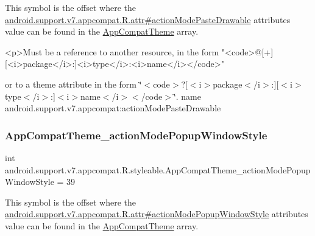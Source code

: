 This symbol is the offset where the \hyperlink{classandroid_1_1support_1_1v7_1_1appcompat_1_1R_1_1attr_a15a0bea2cfb65d234b8d8c3eb6befecf}{android.\+support.\+v7.\+appcompat.\+R.\+attr\#action\+Mode\+Paste\+Drawable} attribute\textquotesingle{}s value can be found in the \hyperlink{classandroid_1_1support_1_1v7_1_1appcompat_1_1R_1_1styleable_a5c42f89e8a410c323be34208d75c430b}{App\+Compat\+Theme} array.

\begin{DoxyVerb}      <p>Must be a reference to another resource, in the form "<code>@[+][<i>package</i>:]<i>type</i>:<i>name</i></code>"
\end{DoxyVerb}
 or to a theme attribute in the form \char`\"{}$<$code$>$?\mbox{[}$<$i$>$package$<$/i$>$\+:\mbox{]}\mbox{[}$<$i$>$type$<$/i$>$\+:\mbox{]}$<$i$>$name$<$/i$>$$<$/code$>$\char`\"{}.  name android.\+support.\+v7.\+appcompat\+:action\+Mode\+Paste\+Drawable \mbox{\label{classandroid_1_1support_1_1v7_1_1appcompat_1_1R_1_1styleable_a1d1be910b7e7c20247eb09a8f6cae188}} 
\subsubsection{\texorpdfstring{App\+Compat\+Theme\+\_\+action\+Mode\+Popup\+Window\+Style}{AppCompatTheme\_actionModePopupWindowStyle}}
{\footnotesize\ttfamily int android.\+support.\+v7.\+appcompat.\+R.\+styleable.\+App\+Compat\+Theme\+\_\+action\+Mode\+Popup\+Window\+Style = 39\hspace{0.3cm}{\ttfamily [static]}}

This symbol is the offset where the \hyperlink{classandroid_1_1support_1_1v7_1_1appcompat_1_1R_1_1attr_a67a1d3ab65459d36fb09a31f7cc71c32}{android.\+support.\+v7.\+appcompat.\+R.\+attr\#action\+Mode\+Popup\+Window\+Style} attribute\textquotesingle{}s value can be found in the \hyperlink{classandroid_1_1support_1_1v7_1_1appcompat_1_1R_1_1styleable_a5c42f89e8a410c323be34208d75c430b}{App\+Compat\+Theme} array.

